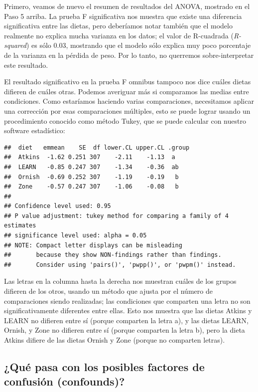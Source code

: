 \documentclass[
  12pt,
]{book}
\begin{document}
Primero, veamos de nuevo el resumen de resultados del ANOVA, mostrado en el Paso 5 arriba. La prueba F significativa nos muestra que existe una diferencia significativa entre las dietas, pero deberíamos notar también que el modelo realmente no explica mucha varianza en los datos; el valor de R-cuadrada (\emph{R-squared}) es sólo 0.03, mostrando que el modelo sólo explica muy poco porcentaje de la varianza en la pérdida de peso. Por lo tanto, no querremos sobre-interpretar este resultado.

El resultado significativo en la prueba F omnibus tampoco nos dice cuáles dietas difieren de cuáles otras. Podemos averiguar más si comparamos las medias entre condiciones. Como estaríamos haciendo varias comparaciones, necesitamos aplicar una corrección por esas comparaciones múltiples, esto se puede lograr usando un procedimiento conocido como método Tukey, que se puede calcular con nuestro software estadístico:

\begin{verbatim}
##  diet   emmean    SE  df lower.CL upper.CL .group
##  Atkins  -1.62 0.251 307    -2.11    -1.13  a    
##  LEARN   -0.85 0.247 307    -1.34    -0.36  ab   
##  Ornish  -0.69 0.252 307    -1.19    -0.19   b   
##  Zone    -0.57 0.247 307    -1.06    -0.08   b   
## 
## Confidence level used: 0.95 
## P value adjustment: tukey method for comparing a family of 4 estimates 
## significance level used: alpha = 0.05 
## NOTE: Compact letter displays can be misleading
##       because they show NON-findings rather than findings.
##       Consider using 'pairs()', 'pwpp()', or 'pwpm()' instead.
\end{verbatim}

Las letras en la columna hasta la derecha nos muestran cuáles de los grupos difieren de los otros, usando un método que ajusta por el número de comparaciones siendo realizadas; las condiciones que comparten una letra no son significativamente diferentes entre ellas. Esto nos muestra que las dietas Atkins y LEARN no difieren entre sí (porque comparten la letra a), y las dietas LEARN, Ornish, y Zone no difieren entre sí (porque comparten la letra b), pero la dieta Atkins difiere de las dietas Ornish y Zone (porque no comparten letras).

\hypertarget{quuxe9-pasa-con-los-posibles-factores-de-confusiuxf3n-confounds}{%
\subsection{¿Qué pasa con los posibles factores de confusión (confounds)?}\label{quuxe9-pasa-con-los-posibles-factores-de-confusiuxf3n-confounds}}
\end{document}

